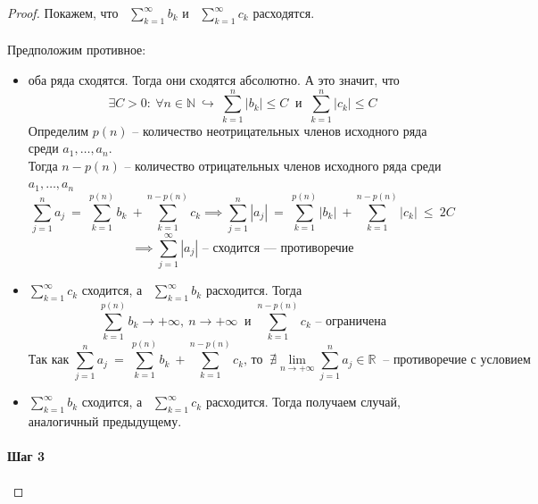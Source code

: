 \documentclass[11pt]{article}
\begin{document}
\begin{proof}
  Покажем, что \ $\displaystyle \sum_{k = 1}^{\infty} b_k$ и \ $\displaystyle 
  \sum_{k = 1}^{\infty} c_k$ расходятся. \\ \\
  Предположим противное: 
  \begin{itemize}
    \item оба ряда сходятся. Тогда они сходятся абсолютно. А это значит, что 
    \[\exists C > 0: \ \forall n \in \mathbb{N} \ \hookrightarrow \ 
    \sum_{k = 1}^{n} \left\lvert b_k \right\rvert \leq C \ \text{ и } \ 
    \sum_{k = 1}^{n} \left\lvert c_k \right\rvert \leq C\]
    Определим $p(n)$ -- количество неотрицательных членов исходного ряда 
    среди $a_1, \ldots, a_n$. \\
    Тогда $n - p(n)$ -- количество отрицательных членов исходного ряда 
    среди $a_1, \ldots, a_n$
    \[\sum_{j = 1}^{n} a_j \ = \ \sum_{k = 1}^{p(n)} b_k \ + 
    \sum_{k = 1}^{n - p(n)} c_k \implies \sum_{j = 1}^{n} \left\lvert a_j 
    \right\rvert \ = \ \sum_{k = 1}^{p(n)} \left\lvert b_k \right\rvert \ + 
    \sum_{k = 1}^{n - p(n)} \left\lvert c_k \right\rvert \ \leq \ 2C\]
    \[\implies \sum_{j = 1}^{\infty} \left\lvert a_j \right\rvert 
    \text{ -- сходится --- противоречие}\]
    \item $\displaystyle \sum_{k = 1}^{\infty} c_k$ сходится, а \ $\displaystyle 
    \sum_{k = 1}^{\infty} b_k$ расходится. Тогда 
    \[\sum_{k = 1}^{p(n)} b_k \to + \infty, \ n \to + \infty \ \text{ и } 
    \sum_{k = 1}^{n - p(n)} c_k \text{ -- ограничена}\]
    \[\text{Так как } \sum_{j = 1}^{n} a_j \ = \ \sum_{k = 1}^{p(n)} b_k \ + 
    \sum_{k = 1}^{n - p(n)} c_k \text{, \ то } \ \nexists \lim_{n \to + \infty} 
    \sum_{j = 1}^{n} a_j \in \mathbb{R} \ \text{ -- противоречие с условием}\]
    \item $\displaystyle \sum_{k = 1}^{\infty} b_k$ сходится, а \ $\displaystyle 
    \sum_{k = 1}^{\infty} c_k$ расходится. Тогда получаем случай, аналогичный 
    предыдущему.
  \end{itemize}

  \paragraph{Шаг 3}


\end{proof}
\end{document}
